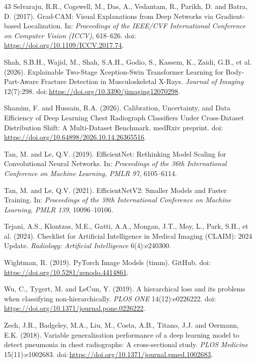 \begin{thebibliography}{43}
Selvaraju, R.R., Cogswell, M., Das, A., Vedantam, R., Parikh, D. and Batra, D. (2017). Grad-CAM: Visual Explanations from Deep Networks via Gradient-based Localization. In: \textit{Proceedings of the IEEE/CVF International Conference on Computer Vision (ICCV)}, 618--626. doi:\,\url{https://doi.org/10.1109/ICCV.2017.74}.

Shah, S.B.H., Wajid, M., Shah, S.A.H., Godio, S., Kassem, K., Zaidi, G.B., et al. (2026). Explainable Two-Stage Xception-Swin Transformer Learning for Body-Part-Aware Fracture Detection in Musculoskeletal X-Rays. \textit{Journal of Imaging} 12(7):298. doi:\,\url{https://doi.org/10.3390/jimaging12070298}.

Shamim, F. and Hussain, R.A. (2026). Calibration, Uncertainty, and Data Efficiency of Deep Learning Chest Radiograph Classifiers Under Cross-Dataset Distribution Shift: A Multi-Dataset Benchmark. medRxiv preprint. doi:\,\url{https://doi.org/10.64898/2026.10.14.26365516}.

Tan, M. and Le, Q.V. (2019). EfficientNet: Rethinking Model Scaling for Convolutional Neural Networks. In: \textit{Proceedings of the 36th International Conference on Machine Learning, PMLR 97}, 6105--6114.

Tan, M. and Le, Q.V. (2021). EfficientNetV2: Smaller Models and Faster Training. In: \textit{Proceedings of the 38th International Conference on Machine Learning, PMLR 139}, 10096--10106.

Tejani, A.S., Klontzas, M.E., Gatti, A.A., Mongan, J.T., Moy, L., Park, S.H., et al. (2024). Checklist for Artificial Intelligence in Medical Imaging (CLAIM): 2024 Update. \textit{Radiology: Artificial Intelligence} 6(4):e240300.

Wightman, R. (2019). PyTorch Image Models (timm). GitHub. doi:\,\url{https://doi.org/10.5281/zenodo.4414861}.

Wu, C., Tygert, M. and LeCun, Y. (2019). A hierarchical loss and its problems when classifying non-hierarchically. \textit{PLOS ONE} 14(12):e0226222. doi:\,\url{https://doi.org/10.1371/journal.pone.0226222}.

Zech, J.R., Badgeley, M.A., Liu, M., Costa, A.B., Titano, J.J. and Oermann, E.K. (2018). Variable generalization performance of a deep learning model to detect pneumonia in chest radiographs: A cross-sectional study. \textit{PLOS Medicine} 15(11):e1002683. doi:\,\url{https://doi.org/10.1371/journal.pmed.1002683}.
\end{thebibliography}
